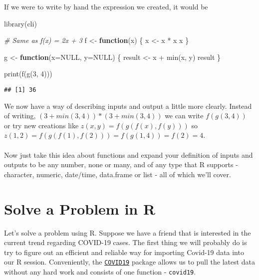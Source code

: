 \documentclass[
]{book}
\newenvironment{Shaded}{\begin{snugshade}}{\end{snugshade}}
\newcommand{\AttributeTok}[1]{\textcolor[rgb]{0.77,0.63,0.00}{#1}}
\newcommand{\CommentTok}[1]{\textcolor[rgb]{0.56,0.35,0.01}{\textit{#1}}}
\newcommand{\ConstantTok}[1]{\textcolor[rgb]{0.00,0.00,0.00}{#1}}
\newcommand{\ControlFlowTok}[1]{\textcolor[rgb]{0.13,0.29,0.53}{\textbf{#1}}}
\newcommand{\DecValTok}[1]{\textcolor[rgb]{0.00,0.00,0.81}{#1}}
\newcommand{\FunctionTok}[1]{\textcolor[rgb]{0.00,0.00,0.00}{#1}}
\newcommand{\NormalTok}[1]{#1}
\newcommand{\OtherTok}[1]{\textcolor[rgb]{0.56,0.35,0.01}{#1}}
\newcommand{\SpecialCharTok}[1]{\textcolor[rgb]{0.00,0.00,0.00}{#1}}
\begin{document}
If we were to write by hand the expression we created, it would be

\begin{Shaded}
\begin{Highlighting}[]
\FunctionTok{library}\NormalTok{(cli)}

\CommentTok{\# Same as f(x) = 2x + 3}
\NormalTok{f }\OtherTok{\textless{}{-}}  \ControlFlowTok{function}\NormalTok{(x) \{}
\NormalTok{  x }\OtherTok{\textless{}{-}}\NormalTok{ x }\SpecialCharTok{*}\NormalTok{ x}
\NormalTok{  x}
\NormalTok{\}}

\NormalTok{g }\OtherTok{\textless{}{-}} \ControlFlowTok{function}\NormalTok{(}\AttributeTok{x=}\ConstantTok{NULL}\NormalTok{, }\AttributeTok{y=}\ConstantTok{NULL}\NormalTok{) \{}
\NormalTok{  result }\OtherTok{\textless{}{-}}\NormalTok{ x }\SpecialCharTok{+} \FunctionTok{min}\NormalTok{(x, y)}
\NormalTok{  result}
\NormalTok{\}}

\FunctionTok{print}\NormalTok{(}\FunctionTok{f}\NormalTok{(}\FunctionTok{g}\NormalTok{(}\DecValTok{3}\NormalTok{, }\DecValTok{4}\NormalTok{)))}
\end{Highlighting}
\end{Shaded}

\begin{verbatim}
## [1] 36
\end{verbatim}

We now have a way of describing inputs and output a little more clearly. Instead of writing, \((3 + min(3, 4)) * (3 + min(3, 4))\) we can write \(f(g(3, 4))\) or try new creations like \(z(x, y)=f(g(f(x), f(y)))\) so \(z(1, 2)=f(g(f(1), f(2)))=f(g(1, 4))=f(2)=4\).\\
~\\
Now just take this idea about functions and expand your definition of inputs and outputs to be any number, none or many, and of any type that R supports - character, numeric, date/time, data.frame or list - all of which we'll cover.

\hypertarget{solve-a-problem-in-r}{%
\section{Solve a Problem in R}\label{solve-a-problem-in-r}}

Let's solve a problem using R. Suppose we have a friend that is interested in the current trend regarding COVID-19 cases. The first thing we will probably do is try to figure out an efficient and reliable way for importing Covid-19 data into our R session. Conveniently, the \href{https://covid19datahub.io/articles/r.html}{\texttt{COVID19}} package allows us to pull the latest data without any hard work and consists of one function - \texttt{covid19}.
\end{document}
